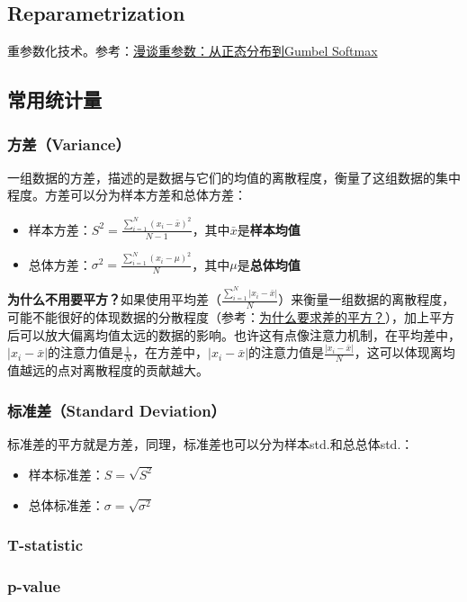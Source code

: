 \subsection{Reparametrization}重参数化技术。参考：\href{https://spaces.ac.cn/archives/6705}{漫谈重参数：从正态分布到Gumbel Softmax}

\subsection{常用统计量}
\subsubsection{方差（Variance）} 一组数据的方差，描述的是数据与它们的均值的离散程度，衡量了这组数据的集中程度。方差可以分为样本方差和总体方差：
\begin{itemize}
	\item 样本方差：$S^2 = \frac{\sum_{i=1}^N(x_i - \bar{x})^2}{N-1}$，其中$\bar{x}$是\textbf{样本均值}
	\item 总体方差：$\sigma^2 = \frac{\sum_{i=1}^N(x_i - \mu)^2}{N}$，其中$\mu$是\textbf{总体均值}
\end{itemize}
\textbf{为什么不用要平方？}如果使用平均差（$\frac{\sum_{i=1}^N |x_i - \bar{x}|}{N}$）来衡量一组数据的离散程度，可能不能很好的体现数据的分散程度（参考：\href{https://www.shuxuele.com/data/standard-deviation.html#WhySquare}{为什么要求差的平方？}），加上平方后可以放大偏离均值太远的数据的影响。也许这有点像注意力机制，在平均差中，$|x_i - \bar{x}|$的注意力值是$\frac{1}{N}$，在方差中，$|x_i - \bar{x}|$的注意力值是$\frac{|x_i - \bar{x}|}{N}$，这可以体现离均值越远的点对离散程度的贡献越大。

\subsubsection{标准差（Standard Deviation）} 标准差的平方就是方差，同理，标准差也可以分为样本std.和总总体std.：
\begin{itemize}
	\item 样本标准差：$S = \sqrt{S^2}$
	\item 总体标准差：$\sigma = \sqrt{\sigma^2}$
\end{itemize}

\subsubsection{T-statistic }


\subsubsection{p-value }

